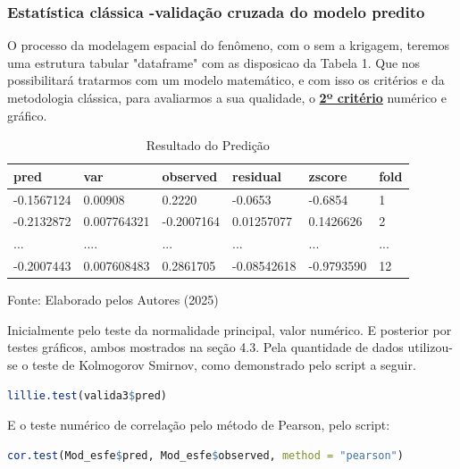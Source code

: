  \subsubsection{Estatística clássica -validação cruzada do modelo predito }
 
 \hspace*{1.25 cm} O processo da modelagem espacial do fenômeno, com o sem a krigagem, teremos uma estrutura tabular "dataframe" com as disposicao da Tabela 1. Que nos possibilitará tratarmos com um modelo matemático, e  com isso os critérios e da metodologia clássica, para avaliarmos a sua qualidade, o \textbf{\underline{2º critério}} numérico e gráfico.
 \begin{table}[h!t]
 	\centering
 	\begin{threeparttable}
 		\caption{Resultado do Predição }
 		\label{Tabela-entrada-avalia5do}
 		\begin{tabular}{ l l l l ll}
 			\toprule
pred&	var&	observed&	residual&	zscore&	fold	 \\\midrule
-0.1567124&0.00908&0.2220&-0.0653&-0.6854&	1 	 \\ 
-0.2132872&	0.007764321	&-0.2007164	&	0.01257077&	0.1426626&	2 \\ 
...&	....&	...&	...&...&... \\ 
-0.2007443	&0.007608483&	0.2861705&	-0.08542618&-0.9793590	&12 \\ 
\bottomrule
 		\end{tabular}%
 		\begin{tablenotes}
 			\item [{\normalsize Fonte:     Elaborado pelos Autores (2025)}]  
 		\end{tablenotes}
 	\end{threeparttable}
 \end{table}
\hspace*{1.25 cm} Inicialmente  pelo teste da normalidade principal, valor numérico. E posterior por testes gráficos, ambos mostrados na seção 4.3. Pela quantidade de dados utilizou-se o teste de Kolmogorov Smirnov, como demonstrado pelo script a seguir.
 
 \lstset{
 	language=R, %
 	caption= Teste Lilliefors (Kolmogorov\_Smirnov)em linguagem R,} %
 \begin{lstlisting}[language=R]
 	lillie.test(valida3$pred)
 \end{lstlisting}  
 \hspace*{1.25 cm}  E o teste numérico de correlação pelo método de Pearson, pelo script:
 \lstset{
 	language=R, %
 	caption= Teste de correlação em linguagem R,} %
 \begin{lstlisting}[language=R]
 	cor.test(Mod_esfe$pred, Mod_esfe$observed, method = "pearson")
 \end{lstlisting} 
 
